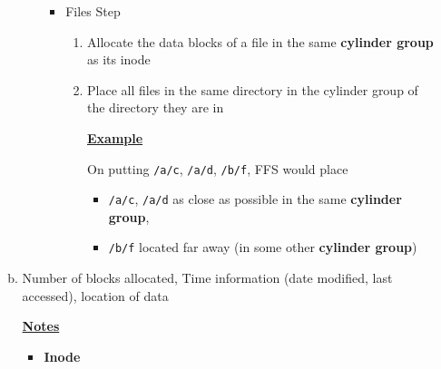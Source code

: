 \documentclass[12pt]{article}
\begin{document}
\begin{enumerate}[1.]
\begin{enumerate}[a)]
\begin{itemize}
\begin{itemize}
                \item Files Step

                \begin{enumerate}[1)]
                    \item Allocate the data blocks of a file in the same \textbf{cylinder group} as its inode
                    \item Place all files in the same directory in the cylinder group of the directory they are in

                    \bigskip

                    \underline{\textbf{Example}}

                    \bigskip

                    On putting \texttt{/a/c}, \texttt{/a/d}, \texttt{/b/f}, FFS would place

                    \begin{itemize}
                        \item \texttt{/a/c}, \texttt{/a/d} as close as possible in the same \textbf{cylinder group},
                        \item \texttt{/b/f} located far away (in some other \textbf{cylinder group})
                    \end{itemize}
                \end{enumerate}
            \end{itemize}
        \end{itemize}

        \item

        Number of blocks allocated, Time information (date modified, last accessed),
        location of data

        \bigskip

        \underline{\textbf{Notes}}

        \begin{itemize}
            \item \textbf{Inode}


\end{itemize}
\end{enumerate}
\end{enumerate}
\end{document}
